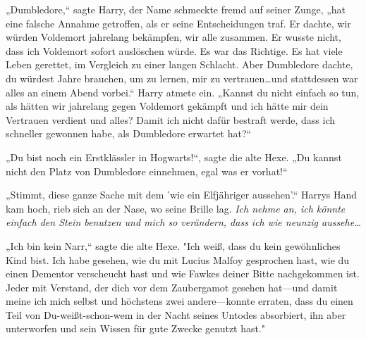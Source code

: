„Dumbledore,“ sagte Harry, der Name schmeckte fremd auf seiner Zunge, „hat eine falsche Annahme getroffen, als er seine Entscheidungen traf. Er dachte, wir würden Voldemort jahrelang bekämpfen, wir alle zusammen. Er wusste nicht, dass ich Voldemort sofort auslöschen würde. Es war das Richtige. Es hat viele Leben gerettet, im Vergleich zu einer langen Schlacht. Aber Dumbledore dachte, du würdest Jahre brauchen, um zu lernen, mir zu vertrauen…und stattdessen war alles an einem Abend vorbei.“
Harry atmete ein.
„Kannst du nicht einfach so tun, als hätten wir jahrelang gegen Voldemort gekämpft und ich hätte mir dein Vertrauen verdient und alles? Damit ich nicht dafür bestraft werde, dass ich schneller gewonnen habe, als Dumbledore erwartet hat?“

„Du bist noch ein Erstklässler in Hogwarts!“, sagte die alte Hexe. „Du kannst nicht den Platz von Dumbledore einnehmen, egal was er vorhat!“

„Stimmt, diese ganze Sache mit dem 'wie ein Elfjähriger aussehen'.“
Harrys Hand kam hoch, rieb sich an der Nase, wo seine Brille lag.
\emph{Ich nehme an, ich könnte einfach den Stein benutzen und mich so verändern, dass ich wie neunzig aussehe…}

„Ich bin kein Narr,“ sagte die alte Hexe. "Ich weiß, dass du kein gewöhnliches Kind bist. Ich habe gesehen, wie du mit Lucius Malfoy gesprochen hast, wie du einen Dementor verscheucht hast und wie Fawkes deiner Bitte nachgekommen ist.
Jeder mit Verstand, der dich vor dem Zaubergamot gesehen hat—und damit meine ich mich selbst und höchstens zwei andere—konnte erraten, dass du einen Teil von Du-weißt-schon-wem in der Nacht seines Untodes absorbiert, ihn aber unterworfen und sein Wissen für gute Zwecke genutzt hast."

